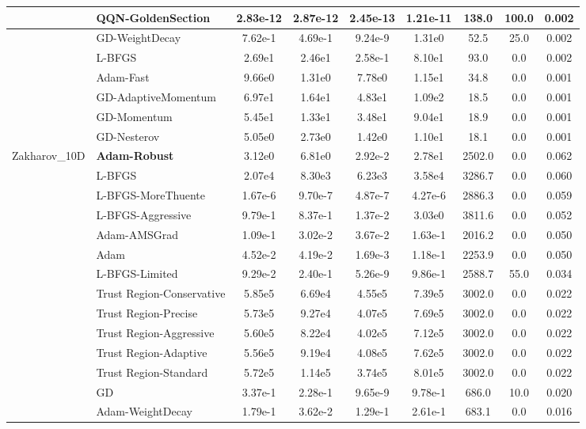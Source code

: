 \documentclass{article}
\begin{document}
\begin{longtable}{|l|l|c|c|c|c|c|c|c|}
\hline
 & QQN-GoldenSection & 2.83e-12 & 2.87e-12 & 2.45e-13 & 1.21e-11 & 138.0 & 100.0 & 0.002 \\
\hline
 & GD-WeightDecay & 7.62e-1 & 4.69e-1 & 9.24e-9 & 1.31e0 & 52.5 & 25.0 & 0.002 \\
\hline
 & L-BFGS & 2.69e1 & 2.46e1 & 2.58e-1 & 8.10e1 & 93.0 & 0.0 & 0.002 \\
\hline
 & Adam-Fast & 9.66e0 & 1.31e0 & 7.78e0 & 1.15e1 & 34.8 & 0.0 & 0.001 \\
\hline
 & GD-AdaptiveMomentum & 6.97e1 & 1.64e1 & 4.83e1 & 1.09e2 & 18.5 & 0.0 & 0.001 \\
\hline
 & GD-Momentum & 5.45e1 & 1.33e1 & 3.48e1 & 9.04e1 & 18.9 & 0.0 & 0.001 \\
\hline
 & GD-Nesterov & 5.05e0 & 2.73e0 & 1.42e0 & 1.10e1 & 18.1 & 0.0 & 0.001 \\
Zakharov\_10D & \textbf{Adam-Robust} & 3.12e0 & 6.81e0 & 2.92e-2 & 2.78e1 & 2502.0 & 0.0 & 0.062 \\
\hline
 & L-BFGS & 2.07e4 & 8.30e3 & 6.23e3 & 3.58e4 & 3286.7 & 0.0 & 0.060 \\
\hline
 & L-BFGS-MoreThuente & 1.67e-6 & 9.70e-7 & 4.87e-7 & 4.27e-6 & 2886.3 & 0.0 & 0.059 \\
\hline
 & L-BFGS-Aggressive & 9.79e-1 & 8.37e-1 & 1.37e-2 & 3.03e0 & 3811.6 & 0.0 & 0.052 \\
\hline
 & Adam-AMSGrad & 1.09e-1 & 3.02e-2 & 3.67e-2 & 1.63e-1 & 2016.2 & 0.0 & 0.050 \\
\hline
 & Adam & 4.52e-2 & 4.19e-2 & 1.69e-3 & 1.18e-1 & 2253.9 & 0.0 & 0.050 \\
\hline
 & L-BFGS-Limited & 9.29e-2 & 2.40e-1 & 5.26e-9 & 9.86e-1 & 2588.7 & 55.0 & 0.034 \\
\hline
 & Trust Region-Conservative & 5.85e5 & 6.69e4 & 4.55e5 & 7.39e5 & 3002.0 & 0.0 & 0.022 \\
\hline
 & Trust Region-Precise & 5.73e5 & 9.27e4 & 4.07e5 & 7.69e5 & 3002.0 & 0.0 & 0.022 \\
\hline
 & Trust Region-Aggressive & 5.60e5 & 8.22e4 & 4.02e5 & 7.12e5 & 3002.0 & 0.0 & 0.022 \\
\hline
 & Trust Region-Adaptive & 5.56e5 & 9.19e4 & 4.08e5 & 7.62e5 & 3002.0 & 0.0 & 0.022 \\
\hline
 & Trust Region-Standard & 5.72e5 & 1.14e5 & 3.74e5 & 8.01e5 & 3002.0 & 0.0 & 0.022 \\
\hline
 & GD & 3.37e-1 & 2.28e-1 & 9.65e-9 & 9.78e-1 & 686.0 & 10.0 & 0.020 \\
\hline
 & Adam-WeightDecay & 1.79e-1 & 3.62e-2 & 1.29e-1 & 2.61e-1 & 683.1 & 0.0 & 0.016 \\

\end{longtable}
\end{document}
